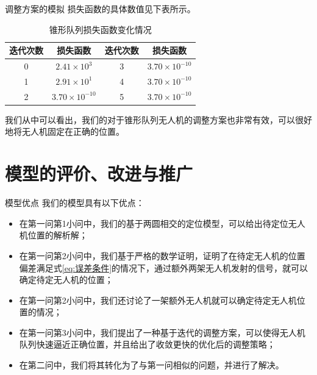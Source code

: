 \documentclass[aspectratio=169]{beamer}
\begin{document}
\begin{frame}{调整方案的模拟}
    损失函数的具体数值见下表所示。
    \begin{table}[!ht]
        \centering
        \caption{锥形队列损失函数变化情况}
        \label{tab:损失函数变化_锥形}
        \begin{tabular}{cc|cc}
            \toprule
            迭代次数 & 损失函数 & 迭代次数 & 损失函数 \\
            \midrule
            0 & $2.41\times 10^3$ & 3 & $3.70\times 10^{-10}$ \\ 
            1 & $2.91\times 10^1$ & 4 & $3.70\times 10^{-10}$ \\ 
            2 & $3.70\times 10^{-10}$ & 5 & $3.70\times 10^{-10}$ \\ 
            \bottomrule
        \end{tabular}
    \end{table}
    我们从中可以看出，我们的对于锥形队列无人机的调整方案也非常有效，可以很好地将无人机固定在正确的位置。
\end{frame}


\section[评价、改进、推广]{模型的评价、改进与推广}

\begin{frame}{模型优点}
    我们的模型具有以下优点：
    \begin{itemize}
        \item 在第一问第1小问中，我们的基于两圆相交的定位模型，可以给出待定位无人机位置的解析解；
        \item 在第一问第2小问中，我们基于严格的数学证明，证明了在待定无人机的位置偏差满足式\ref{eq:误差条件}的情况下，通过额外两架无人机发射的信号，就可以确定待定无人机的位置；
        \item 在第一问第2小问中，我们还讨论了一架额外无人机就可以确定待定无人机位置的情况；
        \item 在第一问第3小问中，我们提出了一种基于迭代的调整方案，可以使得无人机队列快速逼近正确位置，并且给出了收敛更快的优化后的调整策略；
        \item 在第二问中，我们将其转化为了与第一问相似的问题，并进行了解决。
    \end{itemize}
\end{frame}
\end{document}
